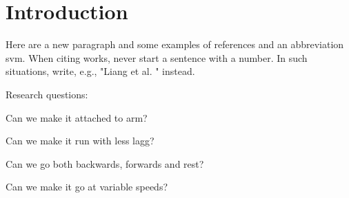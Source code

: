 \section{Introduction}
\label{section:intro}
\blindtext

Here are a new paragraph and some examples of references and an abbreviation \cite{IEEEtran, IEEEtranformatexample, webpage, FundConDep, exampleofjournalarticle, exampleofconferencepaper}
\ac{svm}. When citing works, never start a sentence with a number. In such situations, write, e.g., "Liang et al. \cite{exampleofconferencepaper}" instead.


Research questions:

Can we make it attached to arm?

Can we make it run with less lagg?

Can we go both backwards, forwards and rest?

Can we make it go at variable speeds?
